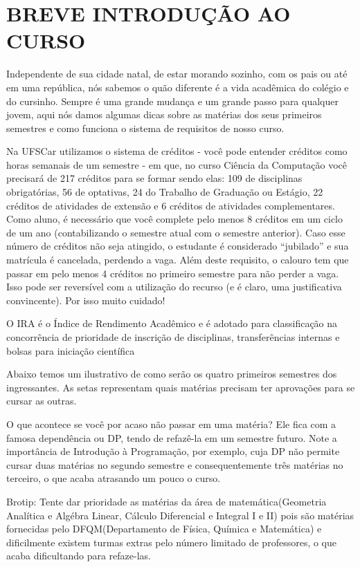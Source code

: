 \section{BREVE INTRODUÇÃO AO CURSO}
Independente de sua cidade natal, de estar morando sozinho, com os pais ou até em uma república, nós sabemos o quão diferente é a vida acadêmica do colégio e do cursinho. Sempre é uma grande mudança e um grande passo para qualquer jovem, aqui nós damos algumas dicas sobre as matérias dos seus primeiros semestres e como funciona o sistema de requisitos de nosso curso.

Na UFSCar utilizamos o sistema de créditos - você pode entender créditos como horas semanais de um semestre - em que, no curso Ciência da Computação você precisará de 217 créditos para se formar sendo elas: 109 de disciplinas obrigatórias, 56 de optativas, 24 do Trabalho de Graduação ou Estágio, 22 créditos de atividades de extensão e 6 créditos de atividades complementares. Como aluno, é necessário que você complete pelo menos 8 créditos em um ciclo de um ano (contabilizando o semestre atual com o semestre anterior). Caso esse número de créditos não seja atingido, o estudante é considerado “jubilado” e sua matrícula é cancelada, perdendo a vaga. Além deste requisito, o calouro tem que passar em pelo menos 4 créditos no primeiro semestre para não perder a vaga. Isso pode ser reversível com a utilização do recurso (e é claro, uma justificativa convincente). Por isso muito cuidado!

O IRA é o Índice de Rendimento Acadêmico e é adotado para classificação na concorrência de prioridade de inscrição de disciplinas, transferências internas e bolsas para iniciação científica

Abaixo temos um ilustrativo de como serão os quatro primeiros semestres dos ingressantes. As setas representam quais matérias precisam ter aprovações para se cursar as outras.

O que acontece se você por acaso não passar em uma matéria? Ele fica com a
famosa dependência ou DP, tendo de refazê-la em um semestre futuro. Note a
importância de Introdução à Programação, por exemplo, cuja DP não permite
cursar duas matérias no segundo semestre e consequentemente três matérias no terceiro, o que acaba atrasando um pouco o curso.

Brotip: Tente dar prioridade as matérias da área de matemática(Geometria Analítica e Algébra Linear, Cálculo Diferencial e Integral I e II) pois são matérias fornecidas pelo DFQM(Departamento de Física, Química e Matemática)
e dificilmente existem turmas extras pelo número limitado de professores, o que acaba dificultando para refaze-las.

